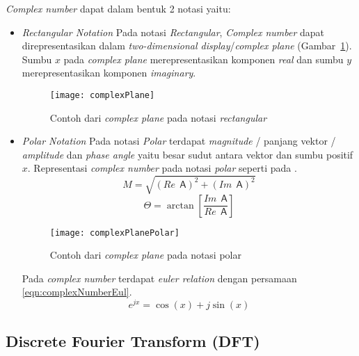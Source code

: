 {\it Complex number} dapat dalam bentuk 2 notasi yaitu:
\begin{itemize}
	\item {\it Rectangular Notation}
		Pada notasi {\it Rectangular}, {\it Complex number} dapat direpresentasikan dalam {\it two-dimensional display}/{\it complex plane} (Gambar~\ref{fig:complexPlane}). Sumbu $x$ pada {\it complex plane} merepresentasikan komponen {\it real} dan sumbu $y$ merepresentasikan komponen {\it imaginary}.

		\begin{figure} [H]
			\centering  
			\texttt{[image: complexPlane]}  
			\caption[Contoh dari {\it complex plane} pada notasi {\it rectangular}]{Contoh dari {\it complex plane} pada notasi {\it rectangular}} 
			\label{fig:complexPlane} 
		\end{figure} 
	\item {\it Polar Notation}
		Pada notasi {\it Polar} terdapat {\it magnitude} / panjang vektor / {\it amplitude} dan {\it phase angle} yaitu besar sudut antara vektor dan sumbu positif $x$. Representasi {\it complex number} pada notasi {\it polar} seperti pada .
			\begin{equation}\label{eqn:complexNumberMag}
				M = \sqrt{(Re \:\: \mathsf{A})^2 + (Im \:\: \mathsf{A})^2}
			\end{equation}
			\begin{equation}\label{eqn:complexNumberPhase}
				\Theta = \arctan [\frac{Im \:\: \mathsf{A}}{Re \:\: \mathsf{A}}]
			\end{equation}
			
			\begin{figure} [H]
			\centering  
			\texttt{[image: complexPlanePolar]}  
			\caption[Contoh dari {\it complex plane} pada notasi polar]{Contoh dari {\it complex plane} pada notasi polar} 
			\label{fig:complexPlanePolar} 
		\end{figure}
		Pada {\it complex number} terdapat {\it euler relation} dengan persamaan \ref{eqn:complexNumberEul}.
			\begin{equation}\label{eqn:complexNumberEul}
				e^{jx} = \cos (x) + j \sin (x)
			\end{equation}		
\end{itemize}

\subsection{Discrete Fourier Transform (DFT) \cite{pariyal:0:differentFFT} \cite{steven:0:dsp}}
\label{subsec:dft}

